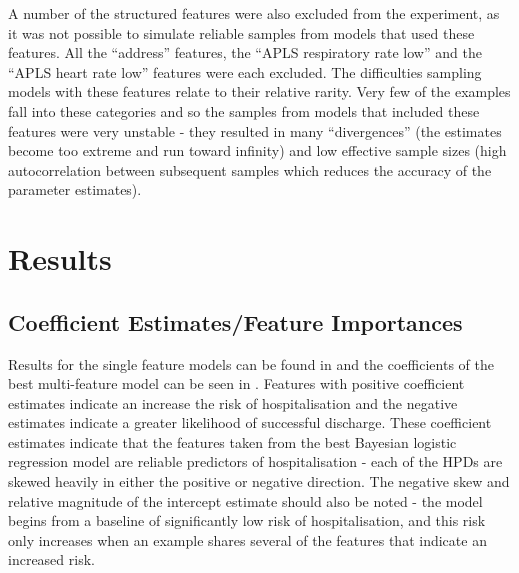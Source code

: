 A number of the structured features were also excluded from the experiment, as it was not possible to simulate reliable samples from models that used these features. All the ``address'' features, the ``APLS respiratory rate low'' and the ``APLS heart rate low'' features were each excluded. The difficulties sampling models with these features relate to their relative rarity. Very few of the examples fall into these categories and so the samples from models that included these features were very unstable - they resulted in many ``divergences'' (the estimates become too extreme and run toward infinity) and low effective sample sizes (high autocorrelation between subsequent samples which reduces the accuracy of the parameter estimates).

\section{Results}\label{sec:results2}

\subsection{Coefficient Estimates/Feature Importances}\label{subsec:coefficient-estimates}

Results for the single feature models can be found in  and the coefficients of the best multi-feature model can be seen in . Features with positive coefficient estimates indicate an increase the risk of hospitalisation and the negative estimates indicate a greater likelihood of successful discharge. These coefficient estimates indicate that the features taken from the best Bayesian logistic regression model are reliable predictors of hospitalisation - each of the HPDs are skewed heavily in either the positive or negative direction. The negative skew and relative magnitude of the intercept estimate should also be noted -  the model begins from a baseline of significantly low risk of hospitalisation, and this risk only increases when an example shares several of the features that indicate an increased risk.

